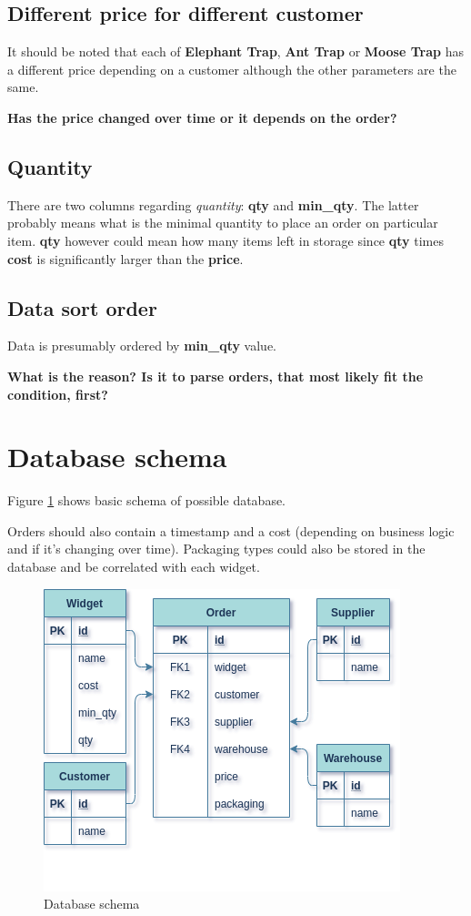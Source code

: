 \documentclass[8pt, a4paper]{article}
\begin{document}
\subsection*{Different price for different customer}

It should be noted that each of \textbf{Elephant Trap}, \textbf{Ant Trap} or \textbf{Moose Trap} has a different price depending on a customer although the other parameters are the same. 

\textbf{Has the price changed over time or it depends on the order?}

\subsection*{Quantity}

There are two columns regarding \textit{quantity}: \textbf{qty} and \textbf{min\_qty}. The latter probably means what is the minimal quantity to place an order on particular item. \textbf{qty} however could mean how many items left in storage since \textbf{qty} times \textbf{cost} is significantly larger than the \textbf{price}.

\subsection*{Data sort order}

Data is presumably ordered by \textbf{min\_qty} value.

\textbf{What is the reason? Is it to parse orders, that most likely fit the condition, first?}


\section*{Database schema}

Figure \ref{schema} shows basic schema of possible database.

Orders should also contain a timestamp and a cost (depending on business logic and if it's changing over time). Packaging types could also be stored in the database and be correlated with each widget.

\begin{figure}
    \centering
    \includegraphics[scale=0.9]{images/schema.png}
    \caption{Database schema}
    \label{schema}
\end{figure}
\end{document}
